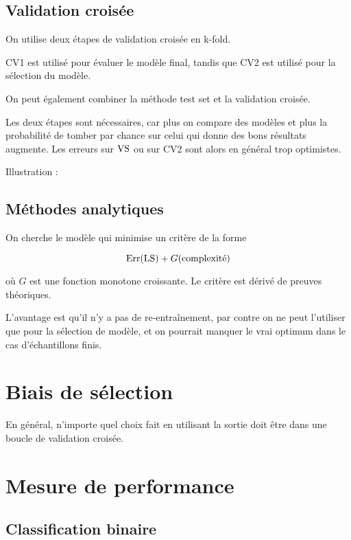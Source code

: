 	\subsection{Validation croisée}
	
	On utilise deux étapes de validation croisée en k-fold.
	
	
	CV1 est utilisé pour évaluer le modèle final, tandis que CV2 est utilisé pour la sélection du modèle.
	
	On peut également combiner la méthode test set et la validation croisée.
	
	
	Les deux étapes sont nécessaires, car plus on compare des modèles et plus la probabilité de tomber par chance sur celui qui donne des bons résultats augmente. Les erreurs sur $\text{VS}$ ou sur CV2 sont alors en général trop optimistes.
	
	Illustration :
	
	
	\subsection{Méthodes analytiques}
	
	On cherche le modèle qui minimise un critère de la forme
	
	$$\text{Err}(\text{LS}) + G(\text{complexité})$$
	
	où $G$ est une fonction monotone croissante. Le critère est dérivé de preuves théoriques.
	
	L'avantage est qu'il n'y a pas de re-entraînement, par contre on ne peut l'utiliser que pour la sélection de modèle, et on pourrait manquer le vrai optimum dans le cas d'échantillons finis.
	
\section{Biais de sélection}
	
	En général, n'importe quel choix fait en utilisant la sortie doit être dans une boucle de validation croisée.
	
		
\section{Mesure de performance}

	\subsection{Classification binaire}
	
